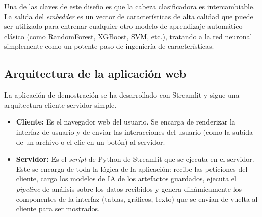 Una de las claves de este diseño es que la cabeza clasificadora es intercambiable. La salida del \textit{embedder} es un vector de características de alta calidad que puede ser utilizado para entrenar cualquier otro modelo de aprendizaje automático clásico (como RandomForest, XGBoost, SVM, etc.), tratando a la red neuronal simplemente como un potente paso de ingeniería de características.


\subsection{Arquitectura de la aplicación web}

La aplicación de demostración se ha desarrollado con Streamlit y sigue una arquitectura cliente-servidor simple.

\begin{itemize}
	\item \textbf{Cliente:} Es el navegador web del usuario. Se encarga de renderizar la interfaz de usuario y de enviar las interacciones del usuario (como la subida de un archivo o el clic en un botón) al servidor.
	
	\item \textbf{Servidor:} Es el \textit{script} de Python de Streamlit que se ejecuta en el servidor. Este se encarga de toda la lógica de la aplicación: recibe las peticiones del cliente, carga los modelos de IA de los artefactos guardados, ejecuta el \textit{pipeline} de análisis sobre los datos recibidos y genera dinámicamente los componentes de la interfaz (tablas, gráficos, texto) que se envían de vuelta al cliente para ser mostrados.
\end{itemize}
